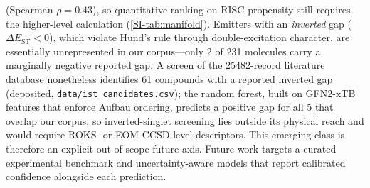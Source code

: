 (Spearman $\rho = 0.43$), so quantitative ranking on RISC propensity still requires the
higher-level calculation (\cref{SI-tab:manifold}). Emitters with an
\emph{inverted} gap ($\Delta E_\text{ST} < 0$), which violate Hund's rule through
double-excitation character,\cite{Veglianti2025} are essentially unrepresented in our
corpus---only \num{2} of \num{231} molecules carry a marginally negative reported gap.
A screen of the \num{25482}-record literature database nonetheless identifies \num{61}
compounds with a reported inverted gap (deposited, \texttt{data/ist\_candidates.csv});
the random forest, built on GFN2-xTB features
that enforce Aufbau ordering, predicts a positive gap for all \num{5} that overlap our
corpus, so inverted-singlet screening lies outside its physical reach and would require
ROKS- or EOM-CCSD-level descriptors.\cite{Salvi2025} This emerging class is therefore an
explicit out-of-scope future axis.
Future work targets a curated experimental benchmark and uncertainty-aware models
that report calibrated confidence alongside each prediction.
